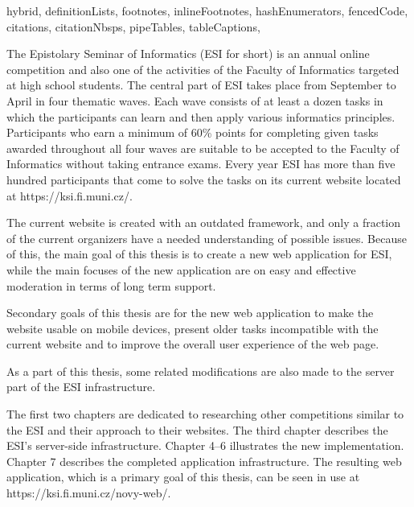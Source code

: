 \documentclass[
  digital, %
  oneside, %
  lof,     %
  lot,     %
]{fithesis4}
\begin{document}
\begin{markdown*}{%
  hybrid,
  definitionLists,
  footnotes,
  inlineFootnotes,
  hashEnumerators,
  fencedCode,
  citations,
  citationNbsps,
  pipeTables,
  tableCaptions,
}

The Epistolary Seminar of Informatics (ESI for short) is an annual online competition and also one of the activities of the Faculty of Informatics targeted at high school students. The central part of ESI takes place from September to April in four thematic waves. Each wave consists of at least a dozen tasks in which the participants can learn and then apply various informatics principles. Participants who earn a minimum of 60\% points for completing given tasks awarded throughout all four waves are suitable to be accepted to the Faculty of Informatics without taking entrance exams. Every year ESI has more than five hundred participants that come to solve the tasks on its current website located at https://ksi.fi.muni.cz/.

The current website is created with an outdated framework, and only a fraction of the current organizers have a needed understanding of possible issues. Because of this, the main goal of this thesis is to create a new web application for ESI, while the main focuses of the new application are on easy and effective moderation in terms of long term support.

Secondary goals of this thesis are for the new web application to make the website usable on mobile devices, present older tasks incompatible with the current website and to improve the overall user experience of the web page.

As a part of this thesis, some related modifications are also made to the server part of the ESI infrastructure.

The first two chapters are dedicated to researching other competitions similar to the ESI and their approach to their websites. The third chapter describes the ESI's server-side infrastructure. Chapter 4–6 illustrates the new implementation. Chapter 7 describes the completed application infrastructure. The resulting web application, which is a primary goal of this thesis, can be seen in use at https://ksi.fi.muni.cz/novy-web/.

\end{markdown*}

\end{document}
